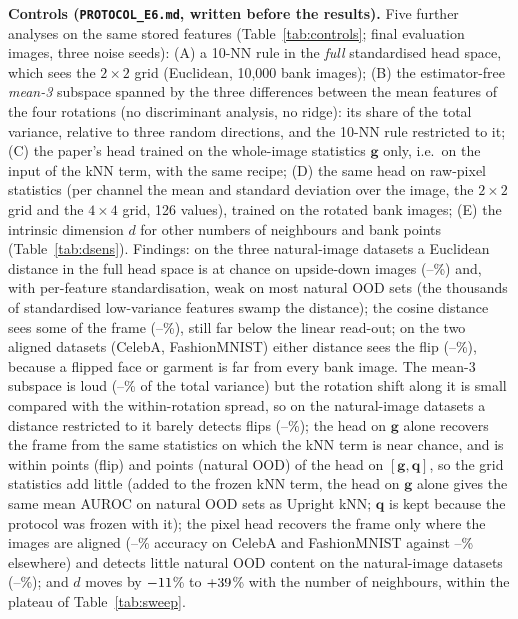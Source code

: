 \documentclass[10pt]{article}
\begin{document}
\textbf{Controls (\texttt{PROTOCOL\_E6.md}, written before the results).} Five further analyses on the same stored features (Table~\ref{tab:controls}; final evaluation images, three noise seeds): (A) a 10-NN rule in the \emph{full} standardised head space, which sees the $2\times2$ grid (Euclidean, 10{,}000 bank images); (B) the estimator-free \emph{mean-3} subspace spanned by the three differences between the mean features of the four rotations (no discriminant analysis, no ridge): its share of the total variance, relative to three random directions, and the 10-NN rule restricted to it; (C) the paper's head trained on the whole-image statistics $\mathbf{g}$ only, i.e.\ on the input of the kNN term, with the same recipe; (D) the same head on raw-pixel statistics (per channel the mean and standard deviation over the image, the $2\times2$ grid and the $4\times4$ grid, 126 values), trained on the rotated bank images; (E) the intrinsic dimension $d$ for other numbers of neighbours and bank points (Table~\ref{tab:dsens}). Findings: on the three natural-image datasets a Euclidean distance in the full head space is at chance on upside-down images (\fullVfNatMin--\fullVfNatMax\%) and, with per-feature standardisation, weak on most natural OOD sets (the thousands of standardised low-variance features swamp the distance); the cosine distance sees some of the frame (\fullCosVfNatMin--\fullCosVfNatMax\%), still far below the linear read-out; on the two aligned datasets (CelebA, FashionMNIST) either distance sees the flip (\fullVfAliMin--\fullVfAliMax\%), because a flipped face or garment is far from every bank image. The mean-3 subspace is loud (\mthreeShareMin--\mthreeShareMax\% of the total variance) but the rotation shift along it is small compared with the within-rotation spread, so on the natural-image datasets a distance restricted to it barely detects flips (\mthreeVfNatMin--\mthreeVfNatMax\%); the head on $\mathbf{g}$ alone recovers the frame from the same statistics on which the kNN term is near chance, and is within \gridGainVfMax{} points (flip) and \gridGainNatMax{} points (natural OOD) of the head on $[\mathbf{g},\mathbf{q}]$, so the grid statistics add little (added to the frozen kNN term, the head on $\mathbf{g}$ alone gives the same mean AUROC on natural OOD sets as Upright kNN; $\mathbf{q}$ is kept because the protocol was frozen with it); the pixel head recovers the frame only where the images are aligned (\pixAccAliMin--\pixAccAliMax\% accuracy on CelebA and FashionMNIST against \pixAccNatMin--\pixAccNatMax\% elsewhere) and detects little natural OOD content on the natural-image datasets (\pixNatNatMin--\pixNatNatMax\%); and $d$ moves by $-11$\% to $+39$\% with the number of neighbours, within the plateau of Table~\ref{tab:sweep}.
\end{document}
